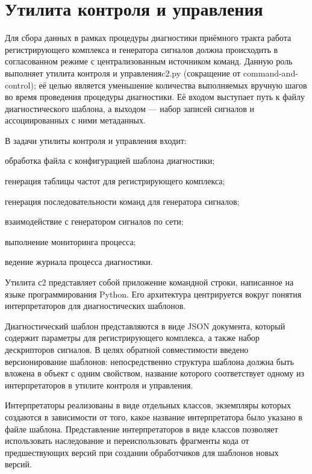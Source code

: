 \documentclass{report}
\begin{document}
\section{Утилита контроля и управления}

Для сбора данных в рамках процедуры диагностики приёмного тракта работа регистрирующего комплекса и генератора сигналов должна происходить в согласованном режиме с централизованным источником команд. Данную роль выполняет утилита контроля и управления\break c2.py (сокращение от command-and-control); её целью является уменьшение количества выполняемых вручную шагов во время проведения процедуры диагностики. Её входом выступает путь к файлу диагностического шаблона, а выходом --- набор записей сигналов и ассоциированных с ними метаданных.

В задачи утилиты контроля и управления входит:

\begin{enummarker}
    \item обработка файла с конфигурацией шаблона диагностики;
    \item генерация таблицы частот для регистрирующего комплекса;
    \item генерация последовательности команд для генератора сигналов;
    \item взаимодействие с генератором сигналов по сети;
    \item выполнение мониторинга процесса;
    \item ведение журнала процесса диагностики.
\end{enummarker}

Утилита с2 представляет собой приложение командной строки, написанное на языке программирования Python. Его архитектура центрируется вокруг понятия интерпретаторов для диагностических шаблонов.

Диагностический шаблон представляются в виде JSON документа, который содержит параметры для регистрирующего комплекса, а также набор дескрипторов сигналов. В целях обратной совместимости введено версионирование шаблонов: непосредственно структура шаблона должна быть вложена в объект с одним свойством, название которого соответствует одному из интерпретаторов в утилите контроля и управления.

Интерпретаторы реализованы в виде отдельных классов, экземпляры которых создаются в зависимости от того, какое название интерпретатора было указано в файле шаблона. Представление интерпретаторов в виде классов позволяет использовать наследование и переиспользовать фрагменты кода от предшествующих версий при создании обработчиков для шаблонов новых версий.
\end{document}

